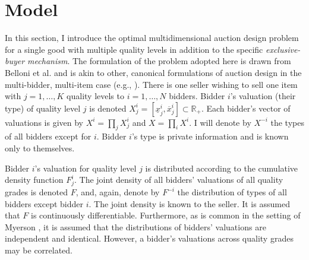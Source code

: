


\section{Model}\label{sec_model}

In this section, I introduce the optimal multidimensional auction design problem for a single good with multiple quality levels in addition to the specific \textit{exclusive-buyer mechanism}. The formulation of the problem adopted here is drawn from Belloni et al. \autocite*{belloni2010multidimensional} and is akin to other, canonical formulations of auction design in the multi-bidder, multi-item case (e.g., \cite{cai2016}). There is one seller wishing to sell one item with $j = 1,\dots,K$ quality levels to $i=1,\dots,N$ bidders. Bidder $i$'s valuation (their type) of quality level $j$ is denoted $X_j^i = [\underline{x}_j^i, \overline{x}_j^i] \subset \mathbb{R}_+$. Each bidder's vector of valuations is given by $X^i = \prod_j X_j^i$ and $X = \prod_i X^i$. I will denote by $X^{-i}$ the types of all bidders except for $i$. Bidder $i$'s type is private information and is known only to themselves. 

Bidder $i$'s valuation for quality level $j$ is distributed according to the cumulative density function $F_j^i$. The joint density of all bidders' valuations of all quality grades is denoted $F$, and, again, denote by $F^{-i}$ the distribution of types of all bidders except bidder $i$. The joint density is known to the seller. It is assumed that $F$ is continuously differentiable. Furthermore, as is common in the setting of Myerson \autocite*{myerson1981optimal}, it is assumed that the distributions of bidders' valuations are independent and identical. However, a bidder's valuations across quality grades may be correlated.

